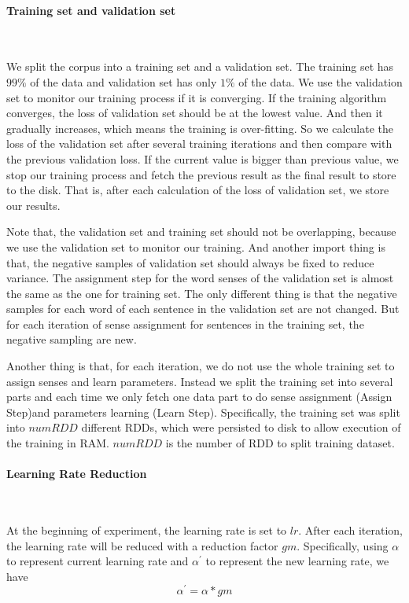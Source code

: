 \paragraph{Training set and validation set} \ 

We split the corpus into a training set and a validation set. The training set has $99\%$ of the data and validation set has only $1\%$ of the data. We use the validation set to monitor our training process if it is converging. If the training algorithm  converges, the loss of validation set should be at the lowest value. And then it gradually increases, which means the training is over-fitting. So we calculate the loss of the validation set after several training iterations and then compare with the previous validation loss. If the current value is bigger than previous value, we stop our training process and fetch the previous result as the final result to store to the disk. That is, after each calculation of the loss of validation set, we store our results. 

Note that, the validation set and training set should not be overlapping, because we use the validation set to monitor our training. And another import thing is that, the negative samples of validation set should always be fixed to reduce variance.  The assignment step for the word senses of the validation set is almost the same as the one for training set. The only different thing is that the negative samples for each word of each sentence in the validation set are not changed. But for each iteration of sense assignment for sentences in the training set, the negative sampling are new. 


Another thing is that, for each iteration, we do not use the whole training set to assign senses and learn parameters. Instead we split the training set into several parts and each time we only fetch one data part to do sense assignment (Assign Step)and parameters learning (Learn Step). Specifically, the training set was split into $numRDD$ different RDDs, which were persisted to disk to allow execution of the training in RAM. $numRDD$ is the number of RDD to split training dataset.

\paragraph{Learning Rate Reduction}\

At the beginning of experiment, the learning rate is set to $lr$. After each iteration, the learning rate will be reduced with a reduction factor $gm$. Specifically, using $\alpha$ to represent current learning rate and $\alpha^\prime$ to represent the new learning rate, we have
$$\alpha^\prime=\alpha*gm$$

